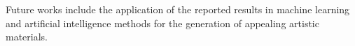 \documentclass[
 aip,
 jmp,
 amsmath,amssymb,
 reprint,
]{revtex4-1}
\begin{document}
Future works include the application of the reported results in machine learning and artificial intelligence methods for the generation of appealing artistic materials. 




\nocite{*}

\end{document}

